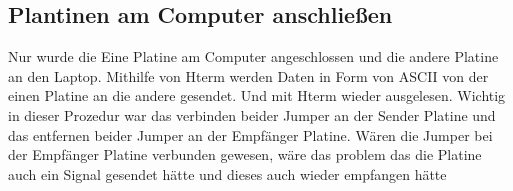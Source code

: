 \subsection{Plantinen am Computer anschließen}
Nur wurde die Eine Platine am Computer angeschlossen und die andere Platine an den Laptop.
Mithilfe von Hterm werden Daten in Form von ASCII von der einen Platine an die andere gesendet.
Und mit Hterm wieder ausgelesen.
Wichtig in dieser Prozedur war das verbinden beider Jumper an der Sender Platine und das entfernen beider
Jumper an der Empfänger Platine. 
Wären die Jumper bei der Empfänger Platine verbunden gewesen, wäre das problem das die Platine auch 
ein Signal gesendet hätte und dieses auch wieder empfangen hätte